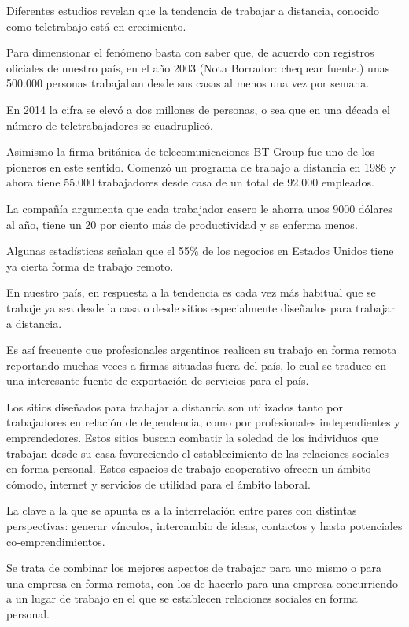 \documentclass[a4paper, 12pt]{article}
\begin{document}
Diferentes estudios revelan que la tendencia de trabajar a distancia, conocido como teletrabajo está en crecimiento. 

Para dimensionar el fenómeno basta con saber que, de acuerdo con registros oficiales de nuestro país, en el año 2003 (Nota Borrador: chequear fuente.) unas 500.000 personas trabajaban desde sus casas al menos una vez por semana. 

En 2014 la cifra se elevó a dos millones de personas, o sea que en una década el número de teletrabajadores se cuadruplicó.

Asimismo la firma británica de telecomunicaciones BT Group fue uno de los pioneros en este sentido. Comenzó un programa de trabajo a distancia en 1986 y ahora tiene 55.000 trabajadores desde casa de un total de 92.000 empleados.

La compañía argumenta que cada trabajador casero le ahorra unos 9000 dólares al año, tiene un 20 por ciento más de productividad y se enferma menos.

Algunas estadísticas señalan que el 55\% de los negocios en Estados Unidos tiene ya cierta forma de trabajo remoto.

En nuestro país, en respuesta a la tendencia es cada vez más habitual que se trabaje ya sea desde la casa o desde sitios especialmente diseñados para trabajar a distancia. 

Es así frecuente que profesionales argentinos realicen su trabajo en forma remota reportando muchas veces a firmas situadas fuera del país, lo cual se traduce en una interesante fuente de exportación de servicios para el país.

Los sitios diseñados para trabajar a distancia son utilizados tanto por trabajadores en relación de dependencia, como por profesionales independientes y emprendedores. Estos sitios buscan combatir la soledad de los individuos que trabajan desde su casa favoreciendo el establecimiento de las relaciones sociales en forma personal. Estos espacios de trabajo cooperativo ofrecen un ámbito cómodo, internet y servicios de utilidad para el ámbito laboral.

La clave a la que se apunta es a la interrelación entre pares con distintas perspectivas: generar vínculos, intercambio de ideas, contactos y hasta potenciales co-emprendimientos. 

Se trata de combinar los mejores aspectos de trabajar para uno mismo o para una empresa en forma remota, con los de hacerlo para una empresa concurriendo a un lugar de trabajo en el que se establecen relaciones sociales en forma personal.
\end{document}
